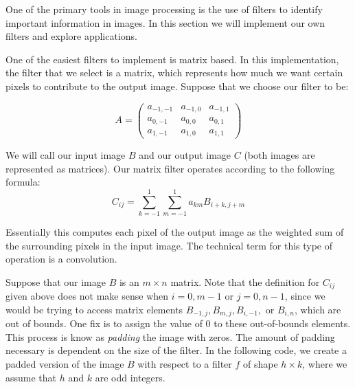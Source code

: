 
One of the primary tools in image processing is the use of filters to identify important information 
in images. In this section we will implement our own filters and explore applications.

One of the easiest filters to implement is matrix based. In this implementation, the filter that we 
select is a matrix, which represents how much we want certain pixels to contribute to the output image. 
Suppose that we choose our filter to be:

\[
A = \begin{pmatrix}
a_{-1,-1}&a_{-1,0}&a_{-1,1}\\
a_{0,-1}&a_{0,0}&a_{0,1}\\
a_{1,-1}&a_{1,0}&a_{1,1}
\end{pmatrix}
\]

We will call our input image $B$ and our output image $C$ (both images are represented as matrices).
Our matrix filter operates according to the following formula:
\[
C_{ij} = \sum_{k=-1}^1 \sum_{m=-1}^1 a_{km}B_{i+k,j+m}
\]

Essentially this computes each pixel of the output image as the weighted sum of the surrounding
pixels in the input image. The technical term for this type of operation is a convolution.

Suppose that our image $B$ is an $m\times n$ matrix. Note that the definition for
$C_{ij}$ given above does not make sense when $i = 0, m-1$ or $j = 0, n-1$, since we would be trying
to access matrix elements $B_{-1,j}, B_{m,j}, B_{i,-1},$ or $B_{i,n}$, which are out of bounds.
One fix is to assign the value of 0 to these out-of-bounds elements. This process is know as \emph{padding}
the image with zeros. The amount of padding necessary is dependent on the size of the filter.
In the following code, we create a padded version of the image $B$ with respect to a filter $f$ of shape 
$h\times k$, where we assume that $h$ and $k$ are odd integers.

